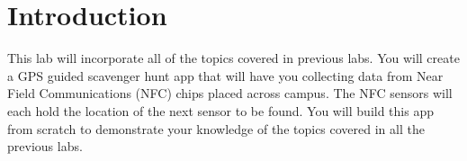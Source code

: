 \section{Introduction}

This lab will incorporate all of the topics covered in previous labs. You will create a GPS guided scavenger hunt app that will have you collecting data from Near Field Communications (NFC) chips placed across campus. The NFC sensors will each hold the location of the next sensor to be found. You will build this app from scratch to demonstrate your knowledge of the topics covered in all the previous labs.